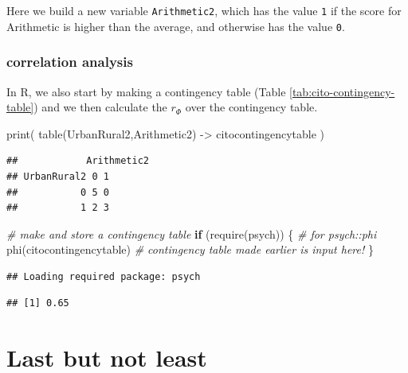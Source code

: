 \documentclass[
]{book}
\newenvironment{Shaded}{\begin{snugshade}}{\end{snugshade}}
\newcommand{\CommentTok}[1]{\textcolor[rgb]{0.56,0.35,0.01}{\textit{#1}}}
\newcommand{\ControlFlowTok}[1]{\textcolor[rgb]{0.13,0.29,0.53}{\textbf{#1}}}
\newcommand{\FunctionTok}[1]{\textcolor[rgb]{0.00,0.00,0.00}{#1}}
\newcommand{\NormalTok}[1]{#1}
\newcommand{\OtherTok}[1]{\textcolor[rgb]{0.56,0.35,0.01}{#1}}
\begin{document}
Here we build a new variable \texttt{Arithmetic2}, which has the value \texttt{1} if the score for
Arithmetic is higher than the average, and otherwise has the value \texttt{0}.

\hypertarget{correlation-analysis-2}{%
\subsubsection{correlation analysis}\label{correlation-analysis-2}}

In R, we also start by making a contingency table (Table \ref{tab:cito-contingency-table}) and we then calculate the \(r_\Phi\) over the contingency table.

\begin{Shaded}
\begin{Highlighting}[]
\FunctionTok{print}\NormalTok{( }\FunctionTok{table}\NormalTok{(UrbanRural2,Arithmetic2) }\OtherTok{{-}\textgreater{}}\NormalTok{ citocontingencytable ) }
\end{Highlighting}
\end{Shaded}

\begin{verbatim}
##            Arithmetic2
## UrbanRural2 0 1
##           0 5 0
##           1 2 3
\end{verbatim}

\begin{Shaded}
\begin{Highlighting}[]
\CommentTok{\# make and store a contingency table}
\ControlFlowTok{if}\NormalTok{ (}\FunctionTok{require}\NormalTok{(psych)) \{ }\CommentTok{\# for psych::phi}
  \FunctionTok{phi}\NormalTok{(citocontingencytable) }\CommentTok{\# contingency table made earlier is input here!}
\NormalTok{\}}
\end{Highlighting}
\end{Shaded}

\begin{verbatim}
## Loading required package: psych
\end{verbatim}

\begin{verbatim}
## [1] 0.65
\end{verbatim}

\hypertarget{sec:correlationcausation}{%
\section{Last but not least}\label{sec:correlationcausation}}
\end{document}
